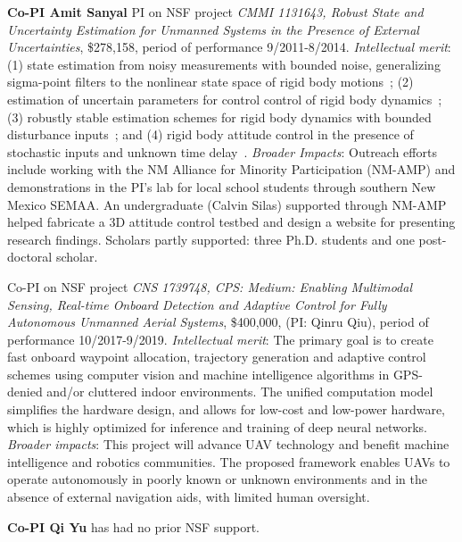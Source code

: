 \documentclass[11pt]{proposalnsf}
\newcommand{\dan}[1]{\textcolor{blue}{{\it [Dan says: #1]}}}
\begin{document}
\begin{sloppypar}
 \vspace{2mm} \noindent
 \textbf{Co-PI Amit Sanyal} PI on NSF project {\em CMMI 1131643, Robust State and Uncertainty 
Estimation for Unmanned Systems in the Presence of External Uncertainties}, \$278,158, period of performance 9/2011-8/2014.  
{\em Intellectual merit}: (1) state estimation from noisy measurements with bounded noise, 
generalizing sigma-point filters to the nonlinear state space of  rigid body motions~\cite{cdc12}; 
(2) estimation of uncertain parameters for control control of rigid body 
dynamics~\cite{jgcd12,joss13,wkbs13}; (3) robustly stable estimation schemes for rigid body 
dynamics with bounded disturbance inputs~\cite{dscobs13,cdcobs13}; and (4) rigid body 
attitude control in the presence of stochastic inputs and unknown time delay~\cite{ebsp15}. 
{\em Broader Impacts}: Outreach efforts include working with the NM Alliance for Minority 
Participation (NM-AMP) and demonstrations in the PI's lab for local school students through 
southern New Mexico SEMAA. An undergraduate (Calvin Silas) supported through 
NM-AMP helped fabricate a 3D attitude control testbed and design a website for presenting 
research findings. Scholars partly supported: three Ph.D. students and one post-doctoral 
scholar.

Co-PI on NSF project {\em CNS 1739748, CPS: Medium: Enabling Multimodal Sensing, Real-time 
Onboard Detection and Adaptive Control for Fully Autonomous Unmanned Aerial Systems}, \$400,000, 
(PI: Qinru Qiu), period of performance 10/2017-9/2019. 
{\em Intellectual merit}: The primary goal is to create fast onboard waypoint allocation, trajectory 
generation and adaptive control schemes using computer vision and machine intelligence algorithms 
in GPS-denied and/or cluttered indoor environments. The unified computation model simplifies the 
hardware design, and allows for low-cost and low-power hardware, which is highly optimized for 
inference and training of deep neural networks. {\em Broader impacts}: This project will advance 
UAV technology and benefit machine intelligence and robotics communities. The proposed framework 
enables UAVs to operate autonomously in poorly known or unknown environments and in the 
absence of external navigation aids, with limited human oversight. 

 \vspace{2mm} \noindent
 \textbf{Co-PI Qi Yu} has had no prior NSF support.






\end{sloppypar}
\end{document}
